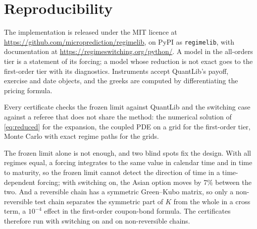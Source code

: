 \documentclass[11pt]{article}
\theoremstyle{remark}
\newcommand{\eps}{\varepsilon}
\newcommand{\ql}{\textsf{QuantLib}}
\begin{document}
\begin{table}[t]\centering\small

\caption{Relative error of the expansion at each order against the numerical solution of the reduced system, for
a $2\times5$ payer swaption under a two-regime Vasicek model, by mean holding time $\eps$ of a symmetric two-state
chain.}
\label{tab:orders}
\end{table}

\begin{table}[t]\centering\small

\caption{Wall-clock time per price with switching on (two regimes, rates 12 and 8), Python on a laptop.}
\label{tab:timings}
\end{table}

\begin{table}[t]\centering\small

\caption{Parameter sensitivities of the first-order Vasicek bond under a three-regime chain, from the derivative of the group inverse
and from central differences of the engine at order one.}
\label{tab:greeks}
\end{table}

\section{Reproducibility}
\label{sec:software}

The implementation is released under the MIT licence at \url{https://github.com/microprediction/regimelib}, on
PyPI as \texttt{regimelib}, with documentation at \url{https://regimeswitching.org/python/}. A model in the
all-orders tier is a statement of its forcing; a model whose reduction is not exact goes to the first-order tier
with its diagnostics. Instruments accept \ql{}'s payoff, exercise and date objects, and the greeks are computed by
differentiating the pricing formula.

Every certificate checks the frozen limit against \ql{} and the switching case against a referee that does not
share the method: the numerical solution of \eqref{eq:reduced} for the expansion, the coupled PDE on a grid for
the first-order tier, Monte Carlo with exact regime paths for the grids.

The frozen limit alone is not enough, and two blind spots fix the design. With all regimes equal, a forcing integrates to the same value in calendar
time and in time to maturity, so the frozen limit cannot detect the direction of time in a time-dependent
forcing; with switching on, the Asian option moves by 7\% between the two. And a reversible chain has a symmetric
Green--Kubo matrix, so only a non-reversible test chain separates the symmetric part of $K$ from the whole in a
cross term, a $10^{-4}$ effect in the first-order coupon-bond formula. The certificates therefore run with
switching on and on non-reversible chains.
\end{document}
